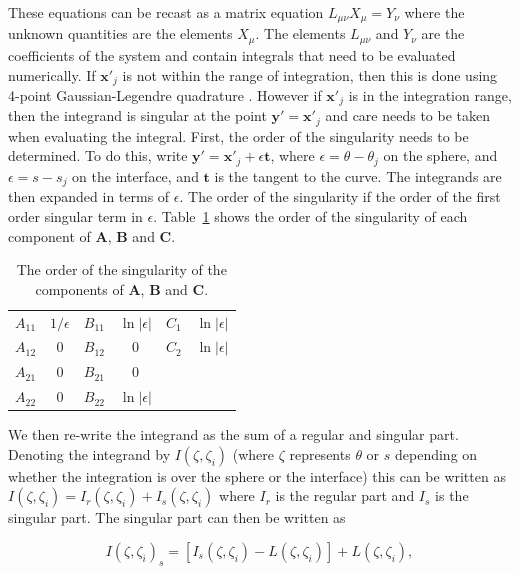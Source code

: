 \documentclass[12pt]{article}
\begin{document}
These equations can be recast as a matrix equation $L_{\mu\nu} X_{\mu} = Y_{\nu}$ where the unknown quantities are the elements $X_{\mu}$. The elements $L_{\mu\nu}$ and $Y_{\nu}$ are the coefficients of the system and contain integrals that need to be evaluated numerically. If $\boldsymbol{x'}_{j}$ is not within the range of integration, then this is done using 4-point Gaussian-Legendre quadrature \citep{Riley06}. However if $\boldsymbol{x'}_{j}$ is in the integration range, then the integrand is singular at the point $\boldsymbol{y'} = \boldsymbol{x'}_{j}$ and care needs to be taken when evaluating the integral. First, the order of the singularity needs to be determined. To do this, write $\boldsymbol{y'} = \boldsymbol{x'}_{j} + \epsilon \boldsymbol{t}$, where $\epsilon = \theta - \theta_{j}$ on the sphere, and $\epsilon = s - s_{j}$ on the interface, and $\boldsymbol{t}$ is the tangent to the curve. The integrands are then expanded in terms of $\epsilon$. The order of the singularity if the order of the first order singular term in $\epsilon$. Table~\ref{tab:sing} shows the order of the singularity of each component of $\boldsymbol{A}$, $\boldsymbol{B}$ and $\boldsymbol{C}$.

\begin{table}
\centering
\caption{The order of the singularity of the components of $\boldsymbol{A}$, $\boldsymbol{B}$ and $\boldsymbol{C}$. \label{tab:sing}}
\begin{tabular}{|c|c||c|c||c|c|}
  \hline
  $A_{11}$ & $1 / \epsilon$ & $B_{11}$ & $\ln|\epsilon|$ & $C_{1}$  & $\ln|\epsilon|$\\
  $A_{12}$ & 0 & $B_{12}$ & 0 & $C_{2}$  & $\ln|\epsilon|$\\
  $A_{21}$ & 0 & $B_{21}$ & 0  &   & \\
  $A_{22}$ & 0 & $B_{22}$ & $\ln|\epsilon|$ &   & \\
  \hline
\end{tabular} 
\end{table}

We then re-write the integrand as the sum of a regular and singular part. Denoting the integrand by $I(\zeta, \zeta_{i})$ (where $\zeta$ represents $\theta$ or $s$ depending on whether the integration is over the sphere or the interface) this can be written as $I(\zeta, \zeta_{i}) = I_{r}(\zeta, \zeta_{i}) + I_{s}(\zeta, \zeta_{i})$ where $I_{r}$ is the regular part and $I_{s}$ is the singular part. The singular part can then be written as

\begin{equation}
\label{equ:sing_meth}
I(\zeta, \zeta_{i})_{s} = [I_{s}(\zeta, \zeta_{i}) -L(\zeta, \zeta_{i})] + L(\zeta, \zeta_{i}),
\end{equation}
\end{document}
